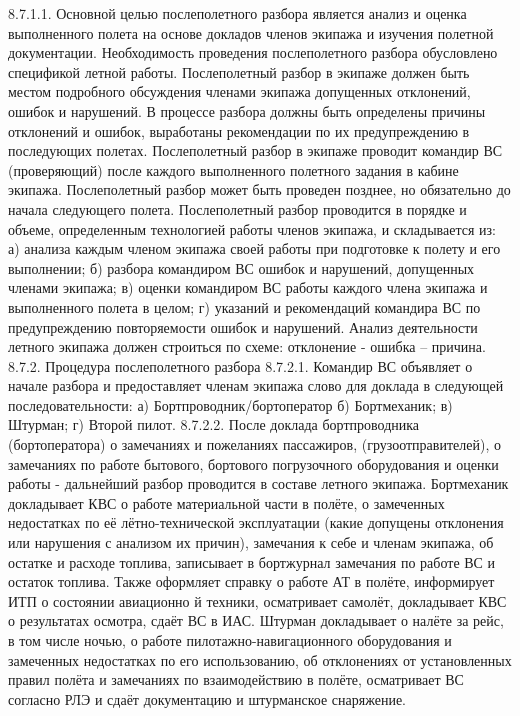 8.7.1.1. Основной целью послеполетного разбора является анализ и оценка выполненного полета на основе докладов членов экипажа и изучения полетной документации. 
Необходимость проведения послеполетного разбора обусловлено спецификой летной работы. 
Послеполетный разбор в экипаже должен быть местом подробного обсуждения членами экипажа допущенных отклонений, ошибок и нарушений. В процессе разбора должны быть определены причины отклонений и ошибок, выработаны рекомендации по их предупреждению в последующих полетах. 
Послеполетный разбор в экипаже проводит командир ВС (проверяющий) после каждого выполненного полетного задания в кабине экипажа. Послеполетный разбор может быть проведен позднее, но обязательно до начала следующего полета. 
Послеполетный разбор проводится в порядке и объеме, определенным технологией работы членов экипажа, и складывается из: 
а)	анализа каждым членом экипажа своей работы при подготовке к полету и его выполнении;
б)	разбора командиром ВС ошибок и нарушений, допущенных членами экипажа;
в)	оценки командиром ВС работы каждого члена экипажа и выполненного полета в целом;
г)	указаний и рекомендаций командира ВС по предупреждению повторяемости ошибок и нарушений.
Анализ деятельности летного экипажа должен строиться по схеме: отклонение - ошибка – причина.
8.7.2. Процедура послеполетного разбора
8.7.2.1. Командир ВС объявляет о начале разбора и предоставляет членам экипажа слово для доклада в следующей последовательности:
а)	Бортпроводник/бортоператор
б)	Бортмеханик;
в)	Штурман;
г)	Второй пилот.
8.7.2.2. После доклада бортпроводника (бортоператора) о замечаниях и пожеланиях пассажиров, (грузоотправителей), о замечаниях по работе бытового, бортового погрузочного оборудования и оценки работы - дальнейший разбор проводится в составе летного экипажа.
Бортмеханик докладывает КВС о работе материальной части в полёте, о замеченных недостатках по её лётно-технической эксплуатации (какие допущены отклонения или нарушения с анализом их причин), замечания к себе и членам экипажа, об остатке и расходе топлива, записывает в бортжурнал замечания по работе ВС и остаток топлива. Также оформляет справку о работе АТ в полёте, информирует ИТП о состоянии авиационно й техники, осматривает самолёт, докладывает КВС о результатах осмотра, сдаёт ВС в ИАС. Штурман докладывает о налёте за рейс, в том числе ночью, о работе пилотажно-навигационного оборудования и замеченных недостатках по его использованию, об отклонениях от установленных правил полёта и замечаниях по взаимодействию в полёте, осматривает ВС согласно РЛЭ и сдаёт документацию и штурманское снаряжение.
